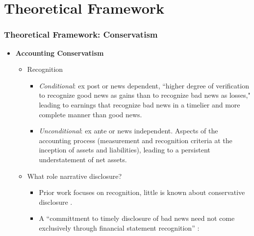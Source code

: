 \documentclass{beamer}
\begin{document}
\section{Theoretical Framework}
\begin{frame}
\frametitle{Theoretical Framework: Conservatism}
\begin{itemize}
	
	\item \textbf{Accounting Conservatism}
	
	\begin{itemize}
		
		\item Recognition \citep{beaverConditionalUnconditionalConservatism2005,ballEarningsQualityUK2005}
			\begin{itemize}
		\item \textit{Conditional}: ex post or news dependent, ``higher degree of verification to recognize good news as gains than to recognize bad news as losses," \citep*[p. 7]{basuConservatismPrincipleAsymmetric1997} leading to earnings that recognize bad news in a timelier and more complete manner than good news.
		\item \textit{Unconditional}: ex ante or news independent. Aspects of the accounting process (measurement and recognition criteria at the inception of assets and liabilities), leading to a persistent understatement of net assets.
		 	\end{itemize}
		\pause
		
		\medskip
		
		\item What role narrative disclosure? 
			\begin{itemize}		
		\item  Prior work focuses on recognition, little is known about conservative disclosure \cite[p.243]{kothariManagersWithholdBad2009}.	
		\item A ``committment to timely disclosure of bad news need not come exclusively through financial statement recognition'' \cite*[p. 73-74]{guayConservativeDisclosure2018}:
			
				
					\end{itemize}
		
	\end{itemize}
	
\end{itemize}
\end{frame}
\end{document}
